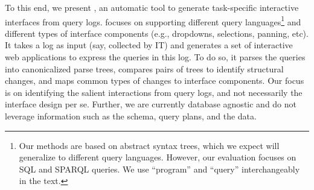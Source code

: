 To this end, we present \sys, an automatic tool to generate task-specific interactive interfaces from query logs.  \sys focuses on supporting different query languages\footnote{\small Our methods are based on abstract syntax trees, which we expect will generalize to different query languages.  However, our evaluation focuses on SQL and SPARQL queries.  We use ``program'' and ``query'' interchangeably in the text.} and different types of interface components (e.g., dropdowns, selections, panning, etc).  It takes a log as input (say, collected by IT) and generates a set of interactive web applications to express the queries in this log.  To do so, it parses the queries into canonicalized parse trees, compares pairs of trees to identify structural changes, and maps common types of changes to interface components.  Our focus is on identifying the salient interactions from query logs, and not necessarily the interface design per se.  Further, we are currently database agnostic and do not leverage information such as the schema, query plans, and the data.

